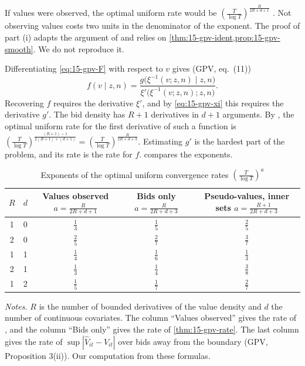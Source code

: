 If values were observed, the optimal uniform rate would be $(\frac{T}{\log T})^{\frac{R}{2R+d+1}}$ \citep{Stone1982}. Not observing values costs two units in the denominator of the exponent. The proof of part (i) adapts the argument of \citet{Khasminskii1976} and relies on \cref{thm:15-gpv-ident,prop:15-gpv-smooth}. We do not reproduce it.

 Differentiating \eqref{eq:15-gpv-F} with respect to $v$ gives (GPV, eq.~(11))
\begin{equation}\label{eq:15-gpv-f-from-xi}
f(v\mid z,n)=\frac{g\big(\xi^{-1}(v;z,n)\mid z,n\big)}{\xi'\big(\xi^{-1}(v;z,n);z,n\big)}.
\end{equation}
Recovering $f$ requires the derivative $\xi'$, and by \eqref{eq:15-gpv-xi} this requires the derivative $g'$. The bid density has $R+1$ derivatives in $d+1$ arguments. By \citet{Stone1982}, the optimal uniform rate for the first derivative of such a function is $(\frac{T}{\log T})^{\frac{(R+1)-1}{2(R+1)+(d+1)}}=(\frac{T}{\log T})^{\frac{R}{2R+d+3}}$. Estimating $g'$ is the hardest part of the problem, and its rate is the rate for $f$.  compares the exponents.

\begin{table}[htbp]
\centering
\begin{threeparttable}
\caption{Exponents of the optimal uniform convergence rates $(\frac{T}{\log T})^{a}$}\label{tab:15-gpv-rates}
\small
\begin{tabular}{ccccc}
\toprule
$R$ & $d$ & \makecell{Values observed\\ $a=\frac{R}{2R+d+1}$} & \makecell{Bids only\\ $a=\frac{R}{2R+d+3}$} & \makecell{Pseudo-values, inner sets\\ $a=\frac{R+1}{2R+d+3}$}\\
\midrule
1 & 0 & $\frac13$ & $\frac15$ & $\frac25$\\[2pt]
2 & 0 & $\frac25$ & $\frac27$ & $\frac37$\\[2pt]
1 & 1 & $\frac14$ & $\frac16$ & $\frac13$\\[2pt]
2 & 1 & $\frac13$ & $\frac14$ & $\frac38$\\[2pt]
1 & 2 & $\frac15$ & $\frac17$ & $\frac27$\\
\bottomrule
\end{tabular}
\begin{tablenotes}
\footnotesize
\item \textit{Notes.} $R$ is the number of bounded derivatives of the value density and $d$ the number of continuous covariates. The column ``Values observed'' gives the rate of \citet{Stone1982}, and the column ``Bids only'' gives the rate of \cref{thm:15-gpv-rate}. The last column gives the rate of $\sup|\hat V_{it}-V_{it}|$ over bids away from the boundary (GPV, Proposition 3(ii)). Our computation from these formulas.
\end{tablenotes}
\end{threeparttable}
\end{table}


